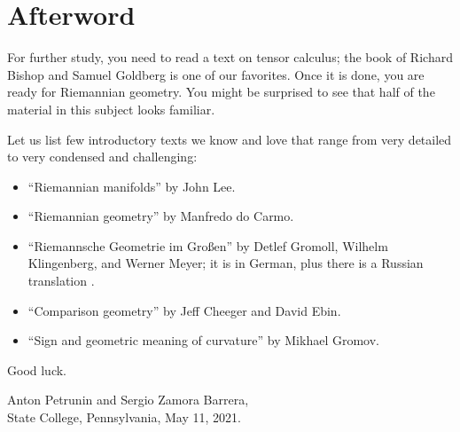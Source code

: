\chapter{Afterword}

For further study, you need to read a text on tensor calculus;
the book of Richard Bishop and Samuel Goldberg \cite{bishop-goldberg} is one of our favorites.
Once it is done, you are ready for Riemannian geometry.
You might be surprised to see that half of the material in this subject looks familiar.

Let us list few introductory texts we know and love that range from very detailed to very condensed and challenging:
\begin{itemize}
\item ``Riemannian manifolds''  \cite{lee2006riemannian} by John Lee.
\item ``Riemannian geometry'' \cite{carmo1992riemannian} by Manfredo do Carmo.
\item ``Riemannsche Geometrie im Großen'' \cite{gromoll-klingenberg-meyer} by 
Detlef Gromoll,
Wilhelm Klingenberg, 
and  Werner Meyer; it is in German, plus there is a Russian translation \cite{gromoll-klingenberg-meyer-ru}.
\item ``Comparison geometry'' \cite{cheeger-ebin} by Jeff Cheeger and David Ebin. 
\item ``Sign and geometric meaning of curvature'' \cite{gromov-1991} by Mikhael Gromov.
\end{itemize}
Good luck.

\begin{flushright}
Anton Petrunin and Sergio Zamora Barrera,\\
State College, Pennsylvania, May 11, 2021.
\end{flushright}
